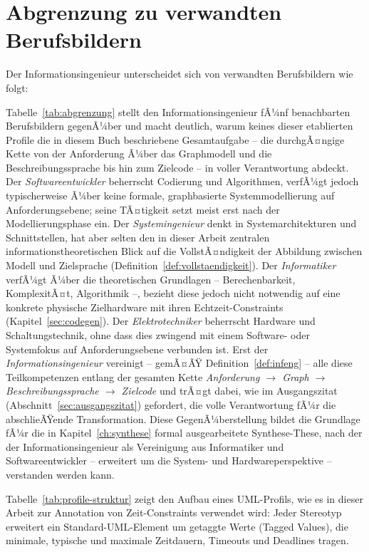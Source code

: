 ﻿\documentclass[a4paper,12pt]{report}
\theoremstyle{definition}
\begin{document}
\section{Abgrenzung zu verwandten Berufsbildern}

Der Informationsingenieur unterscheidet sich von verwandten Berufsbildern wie folgt:

Tabelle~\ref{tab:abgrenzung} stellt den Informationsingenieur fÃ¼nf
benachbarten Berufsbildern gegenÃ¼ber und macht deutlich, warum keines dieser
etablierten Profile die in diesem Buch beschriebene Gesamtaufgabe -- die
durchgÃ¤ngige Kette von der Anforderung Ã¼ber das Graphmodell und die
Beschreibungssprache bis hin zum Zielcode -- in voller Verantwortung
abdeckt. Der \emph{Softwareentwickler} beherrscht Codierung und Algorithmen,
verfÃ¼gt jedoch typischerweise Ã¼ber keine formale, graphbasierte
Systemmodellierung auf Anforderungsebene; seine TÃ¤tigkeit setzt meist erst
nach der Modellierungsphase ein. Der \emph{Systemingenieur} denkt in
Systemarchitekturen und Schnittstellen, hat aber selten den in dieser Arbeit
zentralen informationstheoretischen Blick auf die VollstÃ¤ndigkeit der
Abbildung zwischen Modell und Zielsprache (Definition~\ref{def:vollstaendigkeit}).
Der \emph{Informatiker} verfÃ¼gt Ã¼ber die theoretischen Grundlagen --
Berechenbarkeit, KomplexitÃ¤t, Algorithmik --, bezieht diese jedoch nicht
notwendig auf eine konkrete physische Zielhardware mit ihren
Echtzeit-Constraints (Kapitel~\ref{sec:codegen}). Der \emph{Elektrotechniker}
beherrscht Hardware und Schaltungstechnik, ohne dass dies zwingend mit einem
Software- oder Systemfokus auf Anforderungsebene verbunden ist. Erst der
\emph{Informationsingenieur} vereinigt -- gemÃ¤ÃŸ
Definition~\ref{def:infeng} -- alle diese Teilkompetenzen entlang der
gesamten Kette \emph{Anforderung $\to$ Graph $\to$ Beschreibungssprache
$\to$ Zielcode} und trÃ¤gt dabei, wie im Ausgangszitat
(Abschnitt~\ref{sec:ausgangszitat}) gefordert, die volle Verantwortung fÃ¼r
die abschlieÃŸende Transformation. Diese GegenÃ¼berstellung bildet die
Grundlage fÃ¼r die in Kapitel~\ref{ch:synthese} formal ausgearbeitete
Synthese-These, nach der der Informationsingenieur als Vereinigung aus
Informatiker und Softwareentwickler -- erweitert um die
System- und Hardwareperspektive -- verstanden werden kann.

Tabelle~\ref{tab:profile-struktur} zeigt den Aufbau eines UML-Profils, wie es in dieser Arbeit zur Annotation von Zeit-Constraints verwendet wird: Jeder Stereotyp erweitert ein Standard-UML-Element um getaggte Werte (Tagged Values), die minimale, typische und maximale Zeitdauern, Timeouts und Deadlines tragen.
\end{document}
